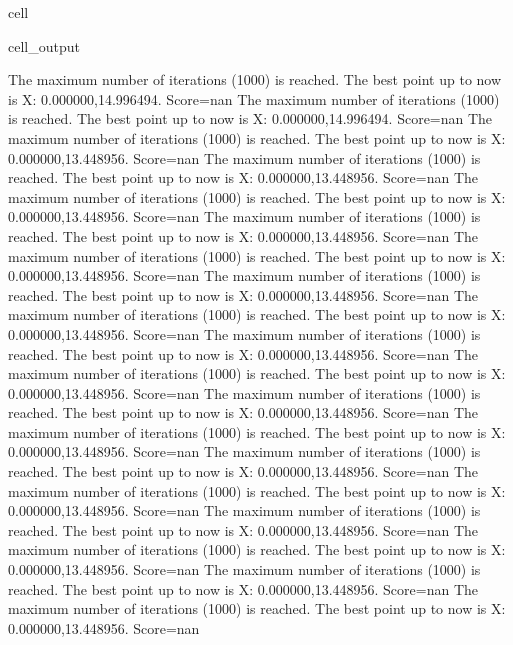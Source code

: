 \documentclass[letterpaper,10pt,english]{jupyterBook}
\begin{document}
\begin{sphinxuseclass}{cell}
\begin{sphinxVerbatimOutput}
\begin{sphinxuseclass}{cell_output}
\begin{sphinxVerbatim}[commandchars=\\\{\}]
The maximum number of iterations (1000) is reached. The best point up to now is X: \PYGZob{}0.000000,14.996494\PYGZcb{}. Score=\PYGZhy{}nan
The maximum number of iterations (1000) is reached. The best point up to now is X: \PYGZob{}0.000000,14.996494\PYGZcb{}. Score=\PYGZhy{}nan
The maximum number of iterations (1000) is reached. The best point up to now is X: \PYGZob{}0.000000,13.448956\PYGZcb{}. Score=\PYGZhy{}nan
The maximum number of iterations (1000) is reached. The best point up to now is X: \PYGZob{}0.000000,13.448956\PYGZcb{}. Score=\PYGZhy{}nan
The maximum number of iterations (1000) is reached. The best point up to now is X: \PYGZob{}0.000000,13.448956\PYGZcb{}. Score=\PYGZhy{}nan
The maximum number of iterations (1000) is reached. The best point up to now is X: \PYGZob{}0.000000,13.448956\PYGZcb{}. Score=\PYGZhy{}nan
The maximum number of iterations (1000) is reached. The best point up to now is X: \PYGZob{}0.000000,13.448956\PYGZcb{}. Score=\PYGZhy{}nan
The maximum number of iterations (1000) is reached. The best point up to now is X: \PYGZob{}0.000000,13.448956\PYGZcb{}. Score=\PYGZhy{}nan
The maximum number of iterations (1000) is reached. The best point up to now is X: \PYGZob{}0.000000,13.448956\PYGZcb{}. Score=\PYGZhy{}nan
The maximum number of iterations (1000) is reached. The best point up to now is X: \PYGZob{}0.000000,13.448956\PYGZcb{}. Score=\PYGZhy{}nan
The maximum number of iterations (1000) is reached. The best point up to now is X: \PYGZob{}0.000000,13.448956\PYGZcb{}. Score=\PYGZhy{}nan
The maximum number of iterations (1000) is reached. The best point up to now is X: \PYGZob{}0.000000,13.448956\PYGZcb{}. Score=\PYGZhy{}nan
The maximum number of iterations (1000) is reached. The best point up to now is X: \PYGZob{}0.000000,13.448956\PYGZcb{}. Score=\PYGZhy{}nan
The maximum number of iterations (1000) is reached. The best point up to now is X: \PYGZob{}0.000000,13.448956\PYGZcb{}. Score=\PYGZhy{}nan
The maximum number of iterations (1000) is reached. The best point up to now is X: \PYGZob{}0.000000,13.448956\PYGZcb{}. Score=\PYGZhy{}nan
The maximum number of iterations (1000) is reached. The best point up to now is X: \PYGZob{}0.000000,13.448956\PYGZcb{}. Score=\PYGZhy{}nan
The maximum number of iterations (1000) is reached. The best point up to now is X: \PYGZob{}0.000000,13.448956\PYGZcb{}. Score=\PYGZhy{}nan
The maximum number of iterations (1000) is reached. The best point up to now is X: \PYGZob{}0.000000,13.448956\PYGZcb{}. Score=\PYGZhy{}nan
The maximum number of iterations (1000) is reached. The best point up to now is X: \PYGZob{}0.000000,13.448956\PYGZcb{}. Score=\PYGZhy{}nan

\end{sphinxVerbatim}
\end{sphinxuseclass}
\end{sphinxVerbatimOutput}
\end{sphinxuseclass}
\end{document}
